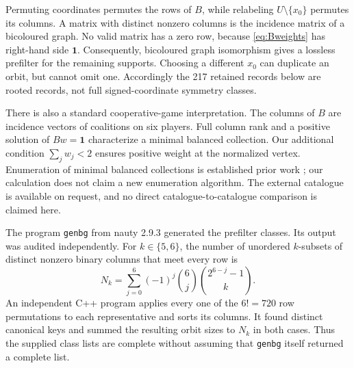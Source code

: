 \documentclass[11pt]{article}
\begin{document}
Permuting coordinates permutes the rows of $B$, while relabeling
$U\setminus\{x_0\}$ permutes its columns. A matrix with distinct nonzero
columns is the incidence matrix of a bicoloured graph. No valid matrix has a
zero row, because \eqref{eq:Bweights} has right-hand side $\boldsymbol1$.
Consequently, bicoloured graph isomorphism gives a lossless prefilter for the
remaining supports. Choosing a different $x_0$ can duplicate an orbit, but
cannot omit one. Accordingly the 217 retained records below are rooted
records, not full signed-coordinate symmetry classes.

There is also a standard cooperative-game interpretation. The columns of
$B$ are incidence vectors of coalitions on six players. Full column rank and
a positive solution of $Bw=\boldsymbol1$ characterize a minimal balanced
collection. Our additional condition $\sum_jw_j<2$ ensures positive weight
at the normalized vertex. Enumeration of minimal balanced collections is
established prior work \cite{MinimalBalanced}; our calculation does not claim
a new enumeration algorithm. The external catalogue is available on request,
and no direct catalogue-to-catalogue comparison is claimed here.

The program \texttt{genbg} from nauty 2.9.3 \cite{McKayPiperno} generated
the prefilter classes. Its output was audited independently. For
$k\in\{5,6\}$, the number of unordered $k$-subsets of distinct nonzero
binary columns that meet every row is
\begin{equation}\label{eq:labelled-count}
 N_k=\sum_{j=0}^6(-1)^j\binom6j
              \binom{2^{6-j}-1}{k}.
\end{equation}
An independent C++ program applies every one of the $6!=720$ row
permutations to each representative and sorts its columns. It found distinct
canonical keys and summed the resulting orbit sizes to $N_k$ in both cases.
Thus the supplied class lists are complete without assuming that
\texttt{genbg} itself returned a complete list.
\end{document}
